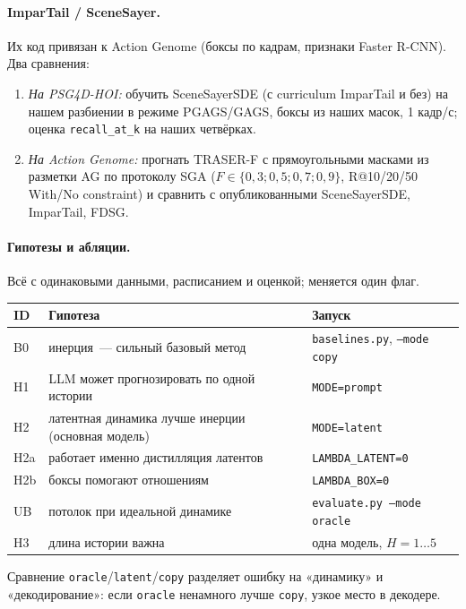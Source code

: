 \documentclass[11pt,a4paper]{article}
\newcommand{\code}[1]{\texttt{#1}}
\begin{document}
\paragraph{ImparTail / SceneSayer.} Их код привязан к Action Genome (боксы по кадрам,
признаки Faster R-CNN). Два сравнения:
\begin{enumerate}
  \item \emph{На PSG4D-HOI:} обучить SceneSayerSDE (с curriculum ImparTail и без) на нашем
        разбиении в режиме PGAGS/GAGS, боксы из наших масок, 1 кадр/с; оценка
        \code{recall\_at\_k} на наших четвёрках.
  \item \emph{На Action Genome:} прогнать TRASER-F с прямоугольными масками из разметки AG по
        протоколу SGA ($F\in\{0{,}3;0{,}5;0{,}7;0{,}9\}$, R@10/20/50 With/No constraint) и
        сравнить с опубликованными SceneSayerSDE, ImparTail, FDSG.
\end{enumerate}

\paragraph{Гипотезы и абляции.} Всё с одинаковыми данными, расписанием и оценкой; меняется один флаг.
\begin{center}
\begin{tabularx}{\linewidth}{@{}lLl@{}}
\toprule
ID & Гипотеза & Запуск \\
\midrule
B0 & инерция~--- сильный базовый метод & \code{baselines.py}, \code{--mode copy} \\
H1 & LLM может прогнозировать по одной истории & \code{MODE=prompt} \\
H2 & латентная динамика лучше инерции (основная модель) & \code{MODE=latent} \\
H2a & работает именно дистилляция латентов & \code{LAMBDA\_LATENT=0} \\
H2b & боксы помогают отношениям & \code{LAMBDA\_BOX=0} \\
UB & потолок при идеальной динамике & \code{evaluate.py --mode oracle} \\
H3 & длина истории важна & одна модель, $H=1\dots5$ \\
\bottomrule
\end{tabularx}
\end{center}
Сравнение \code{oracle}/\code{latent}/\code{copy} разделяет ошибку на «динамику» и
«декодирование»: если \code{oracle} ненамного лучше \code{copy}, узкое место в декодере.

\end{document}
